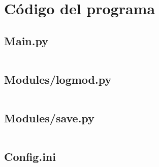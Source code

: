 \chapter{Código del programa}
\newcommand{\ipm}[1]{
	\section{#1}
	\label{#1}
	\vspace*{20pt}
	\inputminted[baselinestretch=1,
	fontsize=\scriptsize,
	linenos,
	breaklines
	]{python3}{Codigo/#1}
	\newpage{}
}

\ipm{Main.py}
\ipm{Modules/logmod.py}
\ipm{Modules/save.py}
\ipm{Config.ini}

